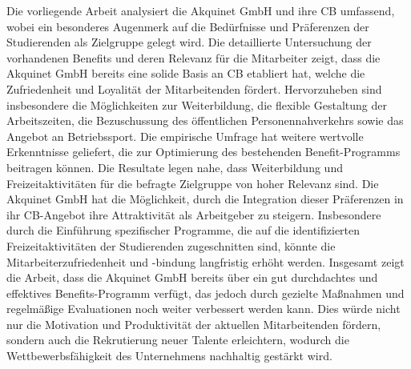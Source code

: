 Die vorliegende Arbeit analysiert die Akquinet GmbH und ihre CB umfassend, wobei ein besonderes Augenmerk auf die Bedürfnisse und Präferenzen der Studierenden als Zielgruppe gelegt wird. Die detaillierte Untersuchung der vorhandenen Benefits und deren Relevanz für die Mitarbeiter zeigt, dass die Akquinet GmbH bereits eine solide Basis an CB etabliert hat, welche die Zufriedenheit und Loyalität der Mitarbeitenden fördert. Hervorzuheben sind insbesondere die Möglichkeiten zur Weiterbildung, die flexible Gestaltung der Arbeitszeiten, die Bezuschussung des öffentlichen Personennahverkehrs sowie das Angebot an Betriebssport.\newline \newline
Die empirische Umfrage hat weitere wertvolle Erkenntnisse geliefert, die zur Optimierung des bestehenden Benefit-Programms beitragen können. Die Resultate legen nahe, dass Weiterbildung und Freizeitaktivitäten für die befragte Zielgruppe von hoher Relevanz sind. Die Akquinet GmbH hat die Möglichkeit, durch die Integration dieser Präferenzen in ihr CB-Angebot ihre Attraktivität als Arbeitgeber zu steigern. Insbesondere durch die Einführung spezifischer Programme, die auf die identifizierten Freizeitaktivitäten der Studierenden zugeschnitten sind, könnte die Mitarbeiterzufriedenheit und -bindung langfristig erhöht werden.\newline \newline
Insgesamt zeigt die Arbeit, dass die Akquinet GmbH bereits über ein gut durchdachtes und effektives Benefits-Programm verfügt, das jedoch durch gezielte Maßnahmen und regelmäßige Evaluationen noch weiter verbessert werden kann. Dies würde nicht nur die Motivation und Produktivität der aktuellen Mitarbeitenden fördern, sondern auch die Rekrutierung neuer Talente erleichtern, wodurch die Wettbewerbsfähigkeit des Unternehmens nachhaltig gestärkt wird.